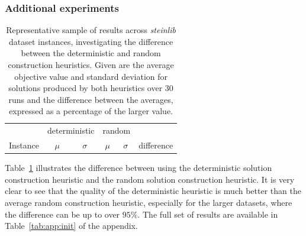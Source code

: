 \documentclass[journal]{IEEEtran}
\begin{document}
\subsubsection*{Additional experiments}
\begin{table}[h!]
\centering
\caption[Deterministic vs. random construction heuristic results]{Representative sample of results across \emph{steinlib} dataset instances, investigating the difference between the deterministic and random construction heuristics. Given are the average objective value and standard deviation for solutions produced by both heuristics over 30 runs and the difference between the averages, expressed as a percentage of the larger value.}\label{tab:stpg:init:trunc} 
\begin{adjustbox}{width=0.45\textwidth}
\begin{tabular}{lrrrrr} \toprule
 & \multicolumn{2}{c}{deterministic} & \multicolumn{2}{c}{random}\\
\cmidrule(lr){2-3} \cmidrule(lr){4-5} 
Instance & \multicolumn{1}{c}{\(\mu\)}&\multicolumn{1}{c}{\(\sigma\)} & \multicolumn{1}{c}{\(\mu\)}&\multicolumn{1}{c}{\(\sigma\)} & difference\\ \midrule
%

%
\bottomrule
\end{tabular}
\end{adjustbox}
\end{table}
Table~\ref{tab:stpg:init:trunc} illustrates the difference between using the deterministic solution construction heuristic and the random solution construction heuristic. It is very clear to see that the quality of the deterministic heuristic is much better than the average random construction heuristic, especially for the larger datasets, where the difference can be up to over \(95\%\). The full set of results are available in Table~\ref{tab:app:init} of the appendix.
\end{document}

